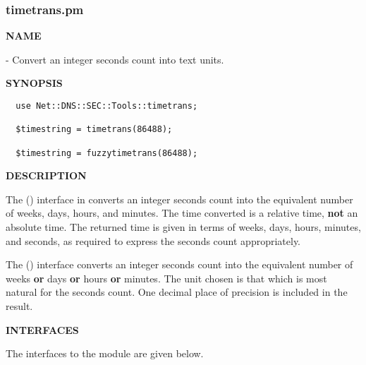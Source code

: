 \clearpage

\subsubsection{timetrans.pm}

{\bf NAME}

 - Convert an integer seconds
count into text units.

{\bf SYNOPSIS}

\begin{verbatim}
  use Net::DNS::SEC::Tools::timetrans;

  $timestring = timetrans(86488);

  $timestring = fuzzytimetrans(86488);
\end{verbatim}

{\bf DESCRIPTION}

The () interface in 
converts an integer seconds count into the equivalent number of weeks, days,
hours, and minutes.  The time converted is a relative time, {\bf not} an
absolute time.  The returned time is given in terms of weeks, days, hours,
minutes, and seconds, as required to express the seconds count appropriately.

The () interface converts an integer seconds count into
the equivalent number of weeks {\bf or} days {\bf or} hours {\bf or} minutes.
The unit chosen is that which is most natural for the seconds count.  One
decimal place of precision is included in the result.

{\bf INTERFACES}

The interfaces to the  module are
given below.

